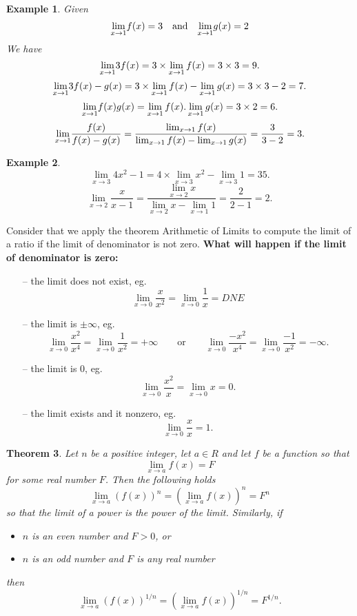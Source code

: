 \documentclass[12pt,a4paper]{book}
\newtheorem{theorem}{Theorem}[section]
\newtheorem{Example}[theorem]{Example}
\numberwithin{equation}{section}
\begin{document}
\begin{Example}
	Given 
	$$\underset{x\rightarrow 1}{\rm lim}f(x)=3\quad \text{and} \quad \underset{x\rightarrow 1}{\rm lim}g(x)=2 $$
	We have 
	 $$\underset{x\rightarrow 1}{\rm lim}3f(x)=3\times \lim_{x\to 1}f(x)=3\times 3=9.$$
		$$\underset{x\rightarrow 1}{\rm lim}3f(x)-g(x)=3\times \lim_{x\to 1}f(x)-\lim_{x\to 1}g(x)=3\times 3- 2=7.$$
		 $$\underset{x\rightarrow 1}{\rm lim}f(x)g(x)=\lim_{x\to 1}f(x).\lim_{x\to 1}g(x)=3\times 2=6.$$
		 $$\underset{x\rightarrow 1}{\rm lim} \frac{f(x)}{f(x)-g(x)}=\frac{\lim_{x\to 1}f(x)}{\lim_{x\to 1}f(x)-\lim_{x\to 1}g(x)}=\frac{3}{3-2}=3.$$
\end{Example}
\begin{Example} 
	
		$$\lim_{x\to 3}4x^2-1=4\times \lim_{x\to 3}x^2-\lim_{x\to 3}1=35.$$
		 $$\lim_{x\to 2}\frac{x}{x-1}=\frac{\lim_{x\to 2}x}{\lim_{x\to 2}x-\lim_{x\to 1}1}=\frac{2}{2-1}=2.$$
	
\end{Example}
Consider that we apply the theorem  Arithmetic of Limits to compute the limit of a ratio if the limit of denominator is not zero. 
{\bf What will happen if the limit of denominator is zero:}
\begin{itemize}
	\item[--] the limit does not exist, eg. 
	$$  \lim_{x\to 0} \frac{x}{x^2}=\lim_{x\to 0} \frac{1}{x}=DNE$$
	\item[--] the limit is $\pm \infty$, eg. 
	$$\lim_{x\to 0} \frac{x^2}{x^4}=\lim_{x\to 0} \frac{1}{x^2}=+\infty \quad \quad \text{or} \quad \quad \lim_{x\to 0} \frac{-x^2}{x^4}=\lim_{x\to 0} \frac{-1}{x^2}=-\infty.$$
	\item[--] the limit is $0$, eg. $$\lim_{x\to 0} \frac{x^2}{x}=\lim_{x\to 0} x=0.$$
	\item[--] the limit exists and it nonzero, eg. $$\lim_{x\to 0} \frac{x}{x}=1.$$
\end{itemize}

\begin{tcolorbox}[width=\textwidth,colback={blue!10},title={},colbacktitle=yellow,coltitle=blue]  
\begin{theorem}
	Let $n$ be a positive integer, let $a\in R$ and let $f$ be a function so that
	$$\lim_{x\to a}f(x)=F$$ for some real number $F$. Then the following holds
	$$ \lim_{x\to a}(f(x))^n=\left( \lim_{x\to a} f(x) \right)^n=F^n$$ so that the limit of a power is the power of the limit. Similarly, if 
	\begin{itemize}
		\item $n$ is an even number and $F>0$, or 
		\item $n$ is an odd number and $F$ is any real number 
	\end{itemize}
then 
$$ \lim_{x\to a}(f(x))^{1/n}=\left( \lim_{x\to a}f(x) \right)^{1/n}=F^{1/n}.$$
	\end{theorem}
\end{tcolorbox}
\end{document}
